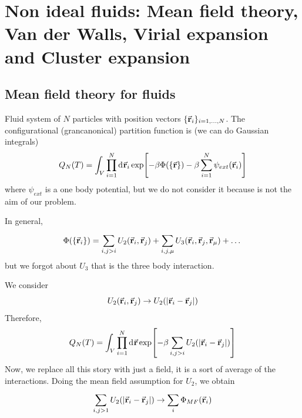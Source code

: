 \documentclass[../main/main.tex]{subfiles}
\begin{document}
\chapter{Non ideal fluids: Mean field theory, Van der Walls, Virial expansion and Cluster expansion}


\section{Mean field theory for fluids}
Fluid system of \( N \) particles with position vectors \( \{ \va{r}_i \}_{i=1,\dots,N}   \). The configurational (grancanonical) partition function is (we can do Gaussian integrals)
\begin{equation}
  Q_N (T) = \int_{V}^{} \prod_{i=1}^{N}  \dd[]{\va{r}_i}  \exp [-\beta \Phi (\{ \va{r} \}  ) - \beta \sum_{i=1}^{N} \psi _{ext}  (\va{r}_i)]
\end{equation}
where \( \psi _{ext} \) is a one body potential, but we do not consider it because is not the aim of our problem.

In general,
\begin{equation}
  \Phi (\{ \va{r}_i \}  ) = \sum_{i,j>i}^{}  U_2 (\va{r}_i,\va{r}_j) + \sum_{i,j, \mu }^{} U_3 (\va{r}_i, \va{r}_j, \va{r}_ \mu ) + \dots
\end{equation}
but we forgot about \( U_3 \) that is the three body interaction.

 We consider
\begin{equation}
   U_2 (\va{r}_i,\va{r}_j) \rightarrow U_2 ( \abs{\va{r}_i - \va{r}_j} )
\end{equation}
Therefore,
\begin{equation}
  Q_N (T) = \int_{V}^{} \prod_{i=1}^{N}  \dd[]{\va{r}}  \exp [-\beta \sum_{i,j > i }^{}  U_2 ( \abs{\va{r}_i - \va{r}_j} ) ]
\end{equation}
Now, we replace all this story with just a field, it is a sort of average of the interactions. Doing the mean field assumption for \( U_2 \), we obtain
\begin{equation}
  \sum_{i,j > 1 }^{}  U_2 ( \abs{\va{r}_i - \va{r}_j} ) \rightarrow \sum_{i}^{} \Phi _{MF} (\va{r}_i)
\end{equation}
\end{document}
